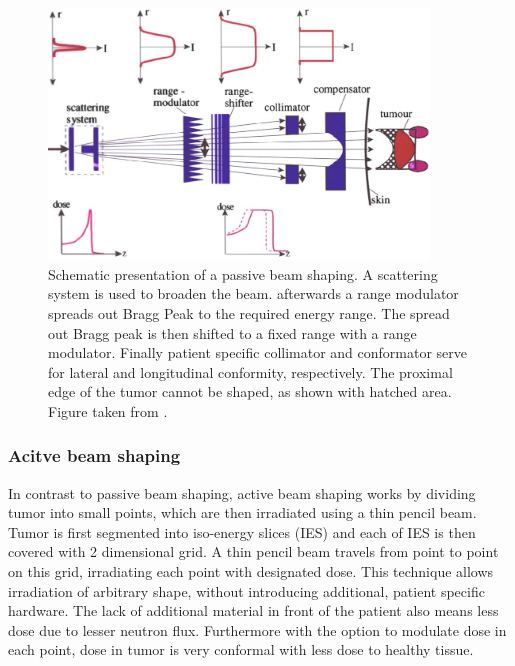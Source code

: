 \documentclass[type=dr, dr=rernat, accentcolor=tud7b,colorbacktitle, bigchapter, openright, twoside, 12pt ]{tudthesis}
\begin{document}
\begin{figure}[H]
\begin{center}
\includegraphics[width=0.9\textwidth]{./Images/deliverypassive.png}
\caption{Schematic presentation of a passive beam shaping. A scattering system is used to broaden the beam. afterwards a range modulator spreads out Bragg Peak to the required energy range.
The spread out Bragg peak is then shifted to a fixed range with a range modulator. Finally patient specific collimator and conformator serve for lateral and longitudinal conformity, respectively.
The proximal edge of the tumor cannot be shaped, as shown with hatched area. Figure taken from \cite{Sch10}.}
\label{passive}
\end{center}
\end{figure}

\subsubsection{Acitve beam shaping}

In contrast to passive beam shaping, active beam shaping works by dividing tumor into small points, which are then irradiated using a thin pencil beam. Tumor is first segmented into iso-energy slices (IES) and each of IES
is then covered with 2 dimensional grid. A thin pencil beam travels from point to point on this grid, irradiating each point with designated dose. This technique allows irradiation of arbitrary shape, without introducing additional, patient specific 
hardware. The lack of additional material in front of the patient also means less dose due to lesser neutron flux. Furthermore with the option to modulate dose in each point, dose in tumor is very conformal with less dose to healthy tissue.
\end{document}
